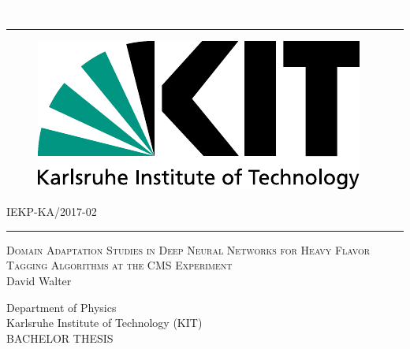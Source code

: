 \begin{titlepage}
  \begin{addmargin}[1.5cm]{0cm}
    \thispagestyle{empty}
    \vspace{-1cm}
    \begin{center}
                \textcolor{white}{´}\vspace{-3.5cm}
                  \rule{\linewidth}{0.75pt}
                    \vspace{-0.15cm}

\begin{figure}[htbp]
  \centering
  \hspace{26pt}
  \includegraphics[scale=0.5]{assets/LogoKit_en}
\end{figure}

      \vspace{-0.45cm}
\hspace{9cm}IEKP-KA/2017-02
\rule{\linewidth}{0.75pt}

\vspace{0.8cm}


\Large{\textsc{Domain Adaptation Studies in Deep Neural Networks for Heavy Flavor Tagging Algorithms at the CMS Experiment}}\\
\vspace{0.9cm}
\Large{David Walter}\\
\vspace{0.9cm}
\vspace{1cm}
\large{Department of Physics\\
  
  Karlsruhe Institute of Technology (KIT)\\
  \vspace{0.825 cm}
  \large{BACHELOR THESIS}\\
  \vspace{0.825 cm}

}
\end{center}
\end{addmargin}
\end{titlepage}

